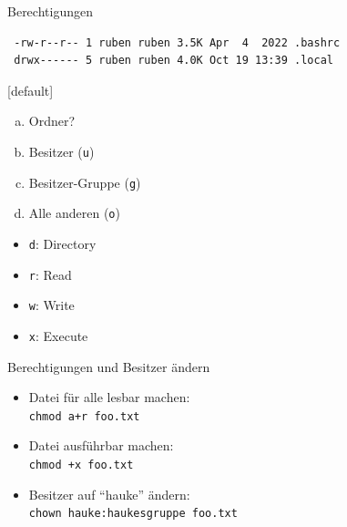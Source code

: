 \documentclass[compress]{beamer}
\begin{document}
\begin{frame}[fragile]{Berechtigungen}
    \vspace{-8mm}

\Huge
\begin{verbatim}
 -rw-r--r-- 1 ruben ruben 3.5K Apr  4  2022 .bashrc
 drwx------ 5 ruben ruben 4.0K Oct 19 13:39 .local
\end{verbatim}

\normalsize

\hspace*{3mm}

{
    [default]
    \begin{enumerate}[a)]
        \item Ordner?
        \item Besitzer (\texttt{u})
        \item Besitzer-Gruppe (\texttt{g})
        \item Alle anderen (\texttt{o})
    \end{enumerate}
}

\begin{itemize}
\item \verb+d+: Directory
\item \verb+r+: Read
\item \verb+w+: Write
\item \verb+x+: Execute
\end{itemize}

\end{frame}

\begin{frame}[fragile]{Berechtigungen und Besitzer ändern}
\begin{itemize}
\item Datei für alle lesbar machen:\\
\verb|chmod a+r foo.txt|
\item Datei ausführbar machen:\\
\verb|chmod +x foo.txt|
\item Besitzer auf \enquote{hauke} ändern:\\
\verb+chown hauke:haukesgruppe foo.txt+
\end{itemize}
\end{frame}
\end{document}
